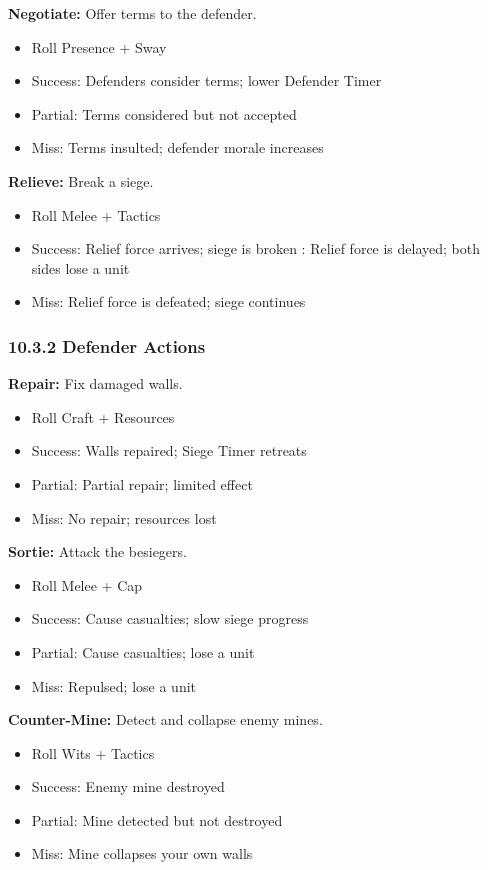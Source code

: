 \documentclass[11pt]{article}
\begin{document}
\textbf{Negotiate:} Offer terms to the defender.
\begin{itemize}
  \item Roll Presence + Sway
  \item Success: Defenders consider terms; lower Defender Timer
  \item Partial: Terms considered but not accepted
  \item Miss: Terms insulted; defender morale increases
\end{itemize}

\textbf{Relieve:} Break a siege.
\begin{itemize}
  \item Roll Melee + Tactics
  \item Success: Relief force arrives; siege is broken
  \partial: Relief force is delayed; both sides lose a unit
  \item Miss: Relief force is defeated; siege continues
\end{itemize}

\subsubsection{10.3.2 Defender Actions}

\textbf{Repair:} Fix damaged walls.
\begin{itemize}
  \item Roll Craft + Resources
  \item Success: Walls repaired; Siege Timer retreats
  \item Partial: Partial repair; limited effect
  \item Miss: No repair; resources lost
\end{itemize}

\textbf{Sortie:} Attack the besiegers.
\begin{itemize}
  \item Roll Melee + Cap
  \item Success: Cause casualties; slow siege progress
  \item Partial: Cause casualties; lose a unit
  \item Miss: Repulsed; lose a unit
\end{itemize}

\textbf{Counter-Mine:} Detect and collapse enemy mines.
\begin{itemize}
  \item Roll Wits + Tactics
  \item Success: Enemy mine destroyed
  \item Partial: Mine detected but not destroyed
  \item Miss: Mine collapses your own walls
\end{itemize}
\end{document}
